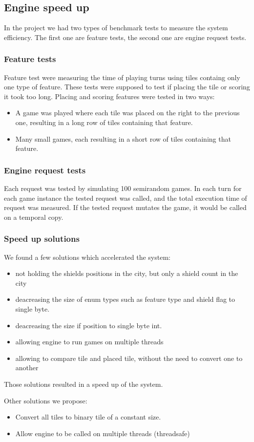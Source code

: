 \subsection{Engine speed up}

In the project we had two types of benchmark tests to measure the system efficiency. The first one are feature tests, the second one are engine request tests.

\subsubsection{Feature tests}
Feature test were measuring the time of playing turns using tiles containg only one type of feature. These tests were supposed to test if placing the tile or scoring it took too long. Placing and scoring features were tested in two ways:
\begin{itemize}
	\item A game was played where each tile was placed on the right to the previous one, resulting in a long row of tiles containing that feature.
	\item Many small games, each resulting in a short row of tiles containing that feature.
\end{itemize} 

\subsubsection{Engine request tests}
Each request was tested by simulating 100 semirandom games. In each turn for each game instance the tested request was called, and the total execution time of request was measured. If the tested request mutates the game, it would be called on a temporal copy.

\subsubsection{Speed up solutions}
We found a few solutions which  accelerated the system:
\begin{itemize}
	\item not holding the shields positions in the city, but only a shield count in the city
	\item deacreasing the size of enum types such as feature type and shield flag to single byte.
\item deacreasing the size if position to single byte int.
	\item allowing engine to run games on multiple threads
	\item allowing to compare tile and placed tile, without the need to convert one to another
\end{itemize} 

Those solutions resulted in a speed up of the system.

Other solutions we propose:
\begin{itemize}
	\item Convert all tiles to binary tile of a constant size.
	\item Allow engine to be called on multiple threads (threadsafe)
\end{itemize} 



